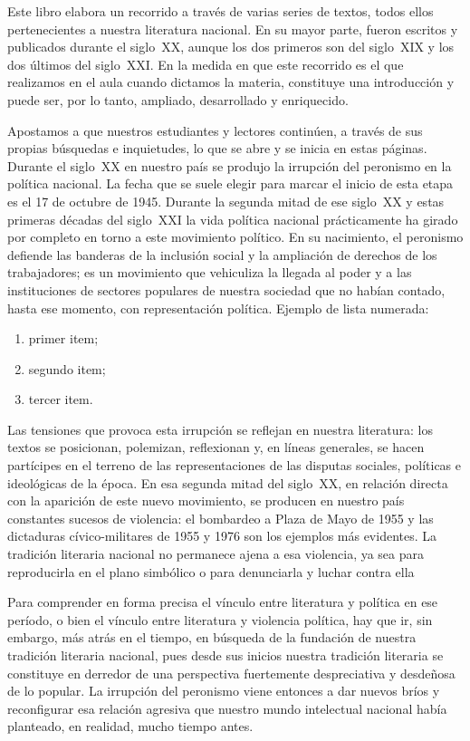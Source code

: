 Este libro elabora un recorrido a través de varias series de textos, todos ellos pertenecientes a nuestra literatura nacional. En su mayor parte, fueron escritos y publicados durante el siglo~XX, aunque los dos primeros son del siglo~XIX y los dos últimos del siglo~XXI. En la medida en que este recorrido es el que realizamos en el aula cuando dictamos la materia, constituye una introducción y puede ser, por lo tanto, ampliado, desarrollado y enriquecido.

Apostamos a que nuestros estudiantes y lectores continúen, a través de sus propias búsquedas e inquietudes, lo que se abre y se inicia en estas páginas. Durante el siglo~XX en nuestro país se produjo la irrupción del peronismo en la política nacional. La fecha que se suele elegir para marcar el inicio de esta etapa es el 17 de octubre de 1945. Durante la segunda mitad de ese siglo~XX y estas primeras décadas del siglo~XXI la vida política nacional prácticamente ha girado por completo en torno a este movimiento político. En su nacimiento, el peronismo defiende las banderas de la inclusión social y la ampliación de derechos de los trabajadores; es un movimiento que vehiculiza la llegada al poder y a las instituciones de sectores populares de nuestra sociedad que no habían contado, hasta ese momento, con representación política. Ejemplo de lista numerada:

\begin{enumerate}
	\item primer item;
	\item segundo item;
	\item tercer item.
\end{enumerate}

Las tensiones que provoca esta irrupción se reflejan en nuestra literatura: los textos se posicionan, polemizan, reflexionan y, en líneas generales, se hacen partícipes en el terreno de las representaciones de las disputas sociales, políticas e ideológicas de la época. En esa segunda mitad del siglo~XX, en relación directa con la aparición de este nuevo movimiento, se producen en nuestro país constantes sucesos de violencia: el bombardeo a Plaza de Mayo de 1955 y las dictaduras cívico-militares de 1955 y 1976 son los ejemplos más evidentes. La tradición literaria nacional no permanece ajena a esa violencia, ya sea para reproducirla en el plano simbólico o para denunciarla y luchar contra ella

Para comprender en forma precisa el vínculo entre literatura y política en ese período, o bien el vínculo entre literatura y violencia política, hay que ir, sin embargo, más atrás en el tiempo, en búsqueda de la fundación de nuestra tradición literaria nacional, pues desde sus inicios nuestra tradición literaria se constituye en derredor de una perspectiva fuertemente despreciativa y desdeñosa de lo popular. La irrupción del peronismo viene entonces a dar nuevos bríos y reconfigurar esa relación agresiva que nuestro mundo intelectual nacional había planteado, en realidad, mucho tiempo antes.

